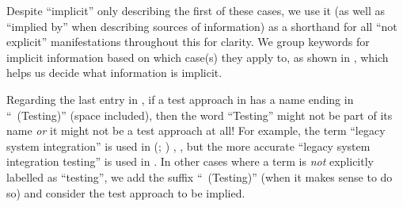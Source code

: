 
Despite ``implicit'' only describing the first of these cases, we use it
(as well as ``implied by'' when describing sources of information) as a
shorthand for all ``not explicit'' manifestations throughout this \docType{}
for clarity. \ifnotpaper We group keywords
    for implicit information based on which case(s) they apply to, as shown in
    , which helps us decide what information is implicit.

    

    Regarding the last entry in , if a test approach in
    \ourApproachGlossary{} has a name ending in ``~(Testing)'' (space
    included), then the word ``Testing'' might not be part of its name
    \emph{or} it might not be a test approach at all! For example, the term
    ``legacy system integration'' is used in \ifnotpaper
        \citeauthor{Gerrard2000a} (\citeyear[pp.~12\==13, Tab.~2]{Gerrard2000a};
        \citeyear[Tab.~1]{Gerrard2000b})\else
        \cite[pp.~12\==13, Tab.~2]{Gerrard2000a},
        \cite[Tab.~1]{Gerrard2000b}\fi, but the more accurate
    ``legacy system integration testing'' is used in
    \citeyearpar[pp.~30\==31]{Gerrard2000b}. In other cases where a
    term is \emph{not} explicitly labelled as ``testing'', we add the
    suffix ``~(Testing)'' (when it makes sense to do so) and consider
    the test approach to be implied.
\fi

